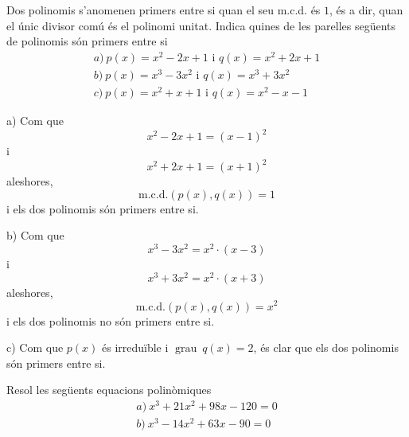 \begin{exercici}
Dos polinomis s'anomenen primers entre si quan el seu m.c.d. és $1$, és a
dir, quan el únic divisor comú és el polinomi unitat. Indica
quines de les parelles següents de polinomis són primers entre si\[
\begin{array}{l}
a)~p(x)=x^{2}-2x+1\text{ i }q(x)=x^{2}+2x+1 \\
b)~p(x)=x^{3}-3x^{2}\text{ i }q(x)=x^{3}+3x^{2} \\
c)~p(x)=x^{2}+x+1\text{ i }q(x)=x^{2}-x-1\end{array}\]
\end{exercici}

\begin{solucio}
a) Com que\[
x^{2}-2x+1=(x-1)^{2}
\]i\[
x^{2}+2x+1=(x+1)^{2}
\]aleshores,\[
\text{m.c.d.}\left( p(x),q(x)\right) =1
\]i els dos polinomis són primers entre si.

b) Com que\[
x^{3}-3x^{2}=x^{2}\cdot (x-3)
\]i\[
x^{3}+3x^{2}=x^{2}\cdot (x+3)
\]aleshores,\[
\text{m.c.d.}\left( p(x),q(x)\right) =x^{2}
\]i els dos polinomis no són primers entre si.

c) Com que $p(x)$ és irreduïble i $\operatorname{grau}~q(x)=2$, és clar que els dos
polinomis són primers entre si.
\end{solucio}

\begin{exercici}
Resol les següents equacions polinòmiques\[
\begin{array}{l}
a)~x^{3}+21x^{2}+98x-120=0 \\
b)~x^{3}-14x^{2}+63x-90=0\end{array}\]
\end{exercici}

